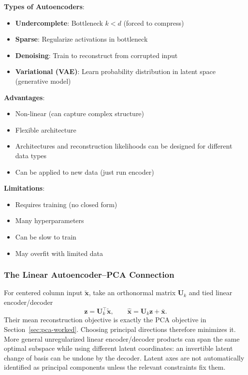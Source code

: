 \documentclass[11pt,twoside]{article}
\numberwithin{equation}{section}
\newcommand{\vect}[1]{\bm{#1}}
\newcommand{\mat}[1]{\bm{#1}}
\theoremstyle{plain}
\theoremstyle{definition}
\theoremstyle{remark}
\newenvironment{keyidea}{
  \begin{tcolorbox}[colback=yellow!5!white,
                    colframe=yellow!50!black,
                    title=Key Idea,
                    breakable,
                    enhanced,
                    sharp corners,
                    boxrule=0.8pt,
                    left=6pt, right=6pt, top=6pt, bottom=6pt]
}{
  \end{tcolorbox}
}
\begin{document}
\begin{keyidea}
\textbf{Types of Autoencoders}:
\begin{itemize}
\item \textbf{Undercomplete}: Bottleneck $k < d$ (forced to compress)
\item \textbf{Sparse}: Regularize activations in bottleneck
\item \textbf{Denoising}: Train to reconstruct from corrupted input
\item \textbf{Variational (VAE)}: Learn probability distribution in latent space (generative model)
\end{itemize}

\textbf{Advantages}:
\begin{itemize}
\item Non-linear (can capture complex structure)
\item Flexible architecture
\item Architectures and reconstruction likelihoods can be designed for different data types
\item Can be applied to new data (just run encoder)
\end{itemize}

\textbf{Limitations}:
\begin{itemize}
\item Requires training (no closed form)
\item Many hyperparameters
\item Can be slow to train
\item May overfit with limited data
\end{itemize}
\end{keyidea}

\subsubsection{The Linear Autoencoder--PCA Connection}
For centered column input $\tilde{\vect x}$, take an orthonormal matrix $\mat U_k$ and tied linear encoder/decoder
\[
\vect z=\mat U_k^\top\tilde{\vect x},\qquad
\hat{\vect x}=\mat U_k\vect z+\bar{\vect x}.
\]
Their mean reconstruction objective is exactly the PCA objective in Section~\ref{sec:pca-worked}. Choosing principal directions therefore minimizes it. More general unregularized linear encoder/decoder products can span the same optimal subspace while using different latent coordinates: an invertible latent change of basis can be undone by the decoder. Latent axes are not automatically identified as principal components unless the relevant constraints fix them.
\end{document}
